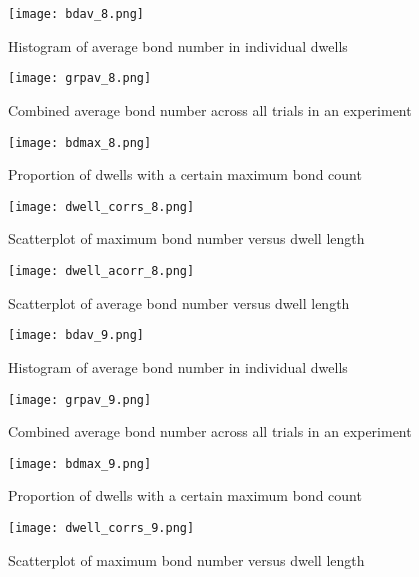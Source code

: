 \documentclass{article}
\begin{document}
\begin{figure}[h]
  \centering
  \texttt{[image: bdav\_8.png]}
  \caption{Histogram of average bond number in individual dwells}
  \label{fig:bd-av-8}
\end{figure}

\begin{figure}[h]
  \centering
  \texttt{[image: grpav\_8.png]}
  \caption{Combined average bond number across all trials in an experiment}
  \label{fig:grp-av-8}
\end{figure}

\begin{figure}[h]
  \centering
  \texttt{[image: bdmax\_8.png]}
  \caption{Proportion of dwells with a certain maximum bond count}
  \label{fig:dwell-corrs-8}
\end{figure}

\begin{figure}[h]
  \centering
  \texttt{[image: dwell\_corrs\_8.png]}
  \caption{Scatterplot of maximum bond number versus dwell length}
  \label{fig:dwell-corrs-8}
\end{figure}

\begin{figure}[h]
  \centering
  \texttt{[image: dwell\_acorr\_8.png]}
  \caption{Scatterplot of average bond number versus dwell length}
  \label{fig:dwell-corrs-8}
\end{figure}

\begin{figure}[h]
  \centering
  \texttt{[image: bdav\_9.png]}
  \caption{Histogram of average bond number in individual dwells}
  \label{fig:bd-av-9}
\end{figure}

\begin{figure}[h]
  \centering
  \texttt{[image: grpav\_9.png]}
  \caption{Combined average bond number across all trials in an experiment}
  \label{fig:grp-av-9}
\end{figure}

\begin{figure}[h]
  \centering
  \texttt{[image: bdmax\_9.png]}
  \caption{Proportion of dwells with a certain maximum bond count}
  \label{fig:dwell-corrs-9}
\end{figure}

\begin{figure}[h]
  \centering
  \texttt{[image: dwell\_corrs\_9.png]}
  \caption{Scatterplot of maximum bond number versus dwell length}
  \label{fig:dwell-corrs-9}
\end{figure}
\end{document}
